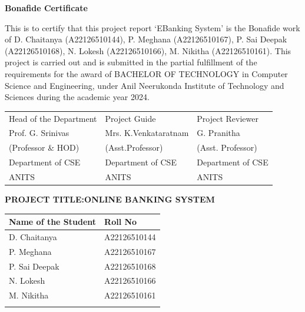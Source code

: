 \begin{titlepage}
  \thispagestyle{empty}
  \begin{center}
    {\huge\bfseries{} Bonafide Certificate\par}
  \end{center}
  \vspace*{1cm}

  This is to certify that this project report `E\-Banking System' is the Bonafide
  work of D. Chaitanya (A22126510144), P. Meghana (A22126510167), P. Sai Deepak
  (A22126510168), N. Lokesh (A22126510166), M. Nikitha (A22126510161).
  This project
  is carried out and is submitted in the partial fulfillment of the requirements
  for the award of BACHELOR OF TECHNOLOGY in Computer Science and Engineering,
  under Anil Neerukonda Institute of Technology and Sciences during the academic
  year 2024.

  \vspace{1cm} %
  \begin{tabular}{lll}
    Head of the Department & Project Guide & Project Reviewer \\
    Prof. G. Srinivas & Mrs. K.Venkataratnam & G. Pranitha \\
    (Professor \& HOD) & (Asst.Professor) & (Asst. Professor) \\
    Department of CSE & Department of CSE & Department of CSE \\
    ANITS & ANITS & ANITS \\
  \end{tabular}

\end{titlepage}

\thispagestyle{empty}
\begin{center}
  \LARGE\textbf{PROJECT TITLE:\@ ONLINE BANKING SYSTEM}\\
  \vspace{2cm}

  \begin{tabular}{|l|l|}
    \hline{}
    \textbf{Name of the Student} & \textbf{Roll No} \\
    \hline{}
    D. Chaitanya & A22126510144 \\
    \hline{}
    P. Meghana & A22126510167 \\
    \hline{}
    P. Sai Deepak & A22126510168 \\
    \hline{}
    N. Lokesh & A22126510166 \\
    \hline{}
    M. Nikitha & A22126510161 \\
    \hline{}
  \end{tabular}
\end{center}
\newpage{}

